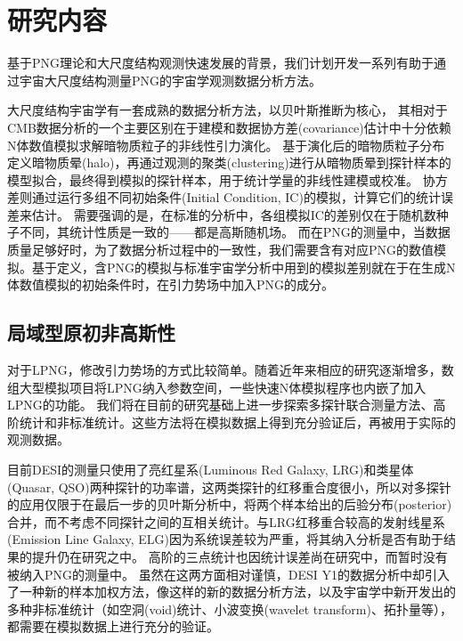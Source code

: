 

\chapter{研究内容}
基于PNG理论和大尺度结构观测快速发展的背景，我们计划开发一系列有助于通过宇宙大尺度结构测量PNG的宇宙学观测数据分析方法。

大尺度结构宇宙学有一套成熟的数据分析方法，以贝叶斯推断为核心，%
其相对于CMB数据分析的一个主要区别在于建模和数据协方差(covariance)估计中十分依赖N体数值模拟求解暗物质粒子的非线性引力演化。
基于演化后的暗物质粒子分布定义暗物质晕(halo)，再通过观测的聚类(clustering)进行从暗物质晕到探针样本的模型拟合，最终得到模拟的探针样本，用于统计学量的非线性建模或校准。
协方差则通过运行多组不同初始条件(Initial Condition, IC)的模拟，计算它们的统计误差来估计。
需要强调的是，在标准的分析中，各组模拟IC的差别仅在于随机数种子不同，其统计性质是一致的——都是高斯随机场。
而在PNG的测量中，当数据质量足够好时，为了数据分析过程中的一致性，我们需要含有对应PNG的数值模拟。基于定义，含PNG的模拟与标准宇宙学分析中用到的模拟差别就在于在生成N体数值模拟的初始条件时，在引力势场中加入PNG的成分。

\section{局域型原初非高斯性}

对于LPNG，修改引力势场的方式比较简单。随着近年来相应的研究逐渐增多，数组大型模拟项目将LPNG纳入参数空间\cite{coulton2022quijotepng,adame2024unitpng,hadzhiyska2024abacuspng}，一些快速N体模拟程序也内嵌了加入LPNG的功能\cite{feng2016fastpm,enriquez2022picola}。
我们将在目前的研究基础上进一步探索多探针联合测量方法、高阶统计和非标准统计。这些方法将在模拟数据上得到充分验证后，再被用于实际的观测数据。

目前DESI的测量\cite{chaussidon2024desipng}只使用了亮红星系(Luminous Red Galaxy, LRG)和类星体(Quasar, QSO)两种探针的功率谱，这两类探针的红移重合度很小，所以对多探针的应用仅限于在最后一步的贝叶斯分析中，将两个样本给出的后验分布(posterior)合并，而不考虑不同探针之间的互相关统计。与LRG红移重合较高的发射线星系(Emission Line Galaxy, ELG)因为系统误差较为严重，将其纳入分析是否有助于结果的提升仍在研究之中。
高阶的三点统计也因统计误差尚在研究中，而暂时没有被纳入PNG的测量中。
虽然在这两方面相对谨慎，DESI Y1的数据分析中却引入了一种新的样本加权方法，像这样的新的数据分析方法，以及宇宙学中新开发出的多种非标准统计（如空洞(void)统计、小波变换(wavelet transform)、拓扑量等），都需要在模拟数据上进行充分的验证。

